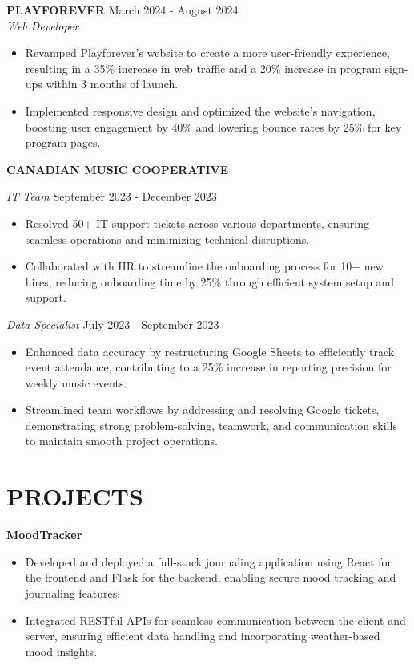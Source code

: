 \documentclass[11pt]{article}
\begin{document}
\textbf{PLAYFOREVER} \hfill March 2024 - August 2024 \\
\textit{Web Developer}
\begin{itemize}[leftmargin=*, itemsep=2pt]
    \item Revamped Playforever’s website to create a more user-friendly experience, resulting in a 35\% increase in web traffic and a 20\% increase in program sign-ups within 3 months of launch.
    \item Implemented responsive design and optimized the website’s navigation, boosting user engagement by 40\% and lowering bounce rates by 25\% for key program pages.
\end{itemize}

\textbf{CANADIAN MUSIC COOPERATIVE}

\textit{IT Team} \hfill September 2023 - December 2023
\begin{itemize}[leftmargin=*, itemsep=2pt]
    \item Resolved 50+ IT support tickets across various departments, ensuring seamless operations and minimizing technical disruptions.
    \item Collaborated with HR to streamline the onboarding process for 10+ new hires, reducing onboarding time by 25\% through efficient system setup and support.
\end{itemize}

\textit{Data Specialist} \hfill July 2023 - September 2023
\begin{itemize}[leftmargin=*, itemsep=2pt]
    \item Enhanced data accuracy by restructuring Google Sheets to efficiently track event attendance, contributing to a 25\% increase in reporting precision for weekly music events.
    \item Streamlined team workflows by addressing and resolving Google tickets, demonstrating strong problem-solving, teamwork, and communication skills to maintain smooth project operations.
\end{itemize}

\section*{PROJECTS}

\textbf{MoodTracker}
\begin{itemize}[leftmargin=*, itemsep=2pt]
    \item Developed and deployed a full-stack journaling application using React for the frontend and Flask for the backend, enabling secure mood tracking and journaling features.
    \item Integrated RESTful APIs for seamless communication between the client and server, ensuring efficient data handling and incorporating weather-based mood insights.
\end{itemize}
\end{document}
